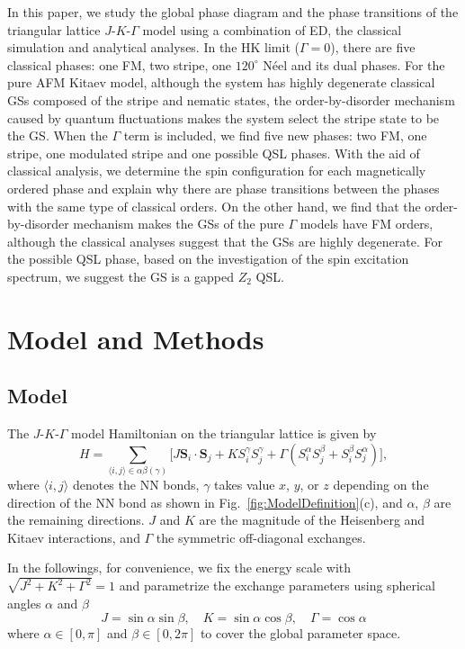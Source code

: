 \documentclass[aps,prb,reprint,amsfonts,amsmath,amssymb,showpacs,groupedaddress,superscriptaddress]{revtex4-1}
\begin{document}
In this paper, we study the global phase diagram and the phase transitions of the triangular lattice $J$-$K$-$\Gamma$ model using a combination of ED, the classical simulation and analytical analyses. In the HK limit ($\Gamma=0$), there are five classical phases: one FM, two stripe, one $120^{\circ}$ N\'{e}el and its dual phases. For the pure AFM Kitaev model, although the system has highly degenerate classical GSs composed of the stripe and nematic states, the order-by-disorder mechanism caused by quantum fluctuations makes the system select the stripe state to be the GS. When the $\Gamma$ term is included, we find five new phases: two FM, one stripe, one modulated stripe and one possible QSL phases. With the aid of classical analysis, we determine the spin configuration for each magnetically ordered phase and explain why there are phase transitions between the phases with the same type of classical orders. On the other hand, we find that the order-by-disorder mechanism makes the GSs of the pure $\Gamma$ models have FM orders, although the classical analyses suggest that the GSs are highly degenerate. For the possible QSL phase, based on the investigation of the spin excitation spectrum, we suggest the GS is a gapped $Z_{2}$ QSL.

\section{Model and Methods}

\subsection{\label{sec:Model}Model}

The $J$-$K$-$\Gamma$ model Hamiltonian on the triangular lattice is given by
\begin{equation}
    H = \sum_{\langle i,j \rangle \in \alpha \beta (\gamma)} \lbrack J \bm{S}_i \cdot \bm{S}_j + K S_i^{\gamma} S_j^{\gamma} + \Gamma (S_i^{\alpha} S_j^{\beta} + S_i^{\beta} S_j^{\alpha}) \rbrack,
    \label{eq:Hamiltonian}
\end{equation}
where $\langle i,j \rangle$ denotes the NN bonds, $\gamma$ takes value $x$, $y$, or $z$ depending on the direction of the NN bond as shown in Fig.~\ref{fig:ModelDefinition}(c), and $\alpha$, $\beta$ are the remaining directions. $J$ and $K$ are the magnitude of the Heisenberg and Kitaev interactions, and $\Gamma$ the symmetric off-diagonal exchanges.

In the followings, for convenience, we fix the energy scale with $\sqrt{J^2 + K^2 + \Gamma^2}=1$ and parametrize the exchange parameters using spherical angles $\alpha$ and $\beta$
\begin{equation}
    J = \sin\alpha \sin\beta, \quad
    K = \sin\alpha \cos\beta, \quad
    \Gamma = \cos\alpha
    \label{eq:Parameters}
\end{equation}
where $\alpha \in [0, \pi]$ and $\beta \in [0, 2\pi]$ to cover the global parameter space.
\end{document}
